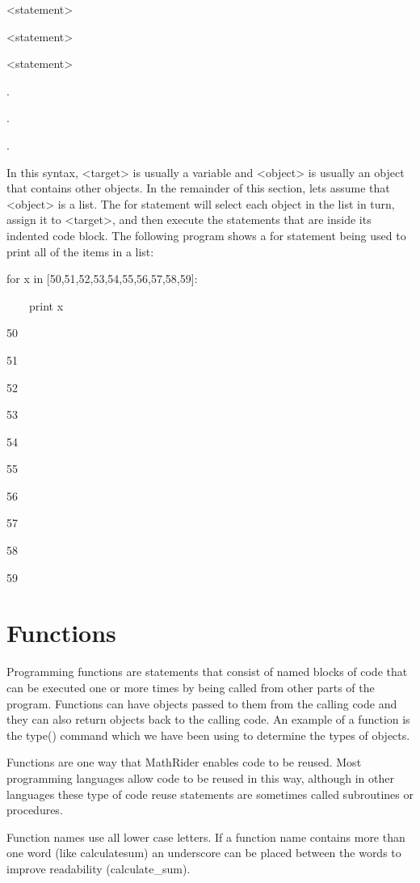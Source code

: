 \documentclass[12pt,oneside]{book}
\begin{document}
 {\textless}statement{\textgreater}

 {\textless}statement{\textgreater}

 {\textless}statement{\textgreater}

.

.

.


In this syntax, {\textless}target{\textgreater} is usually a variable and {\textless}object{\textgreater} is usually an object that contains other objects. In the remainder of this section, lets assume that {\textless}object{\textgreater} is a list. The for statement will select each object in the list in turn, assign it to {\textless}target{\textgreater}, and then execute the statements that are inside its indented code block. The following program shows a for statement being used to print all of the items in a list: 

for x in [50,51,52,53,54,55,56,57,58,59]:

\ \ \ \ print x

{\textbar}

50

51

52

53

54

55

56

57

58

59

\section[Functions]{Functions}

Programming functions are statements that consist of named blocks of code that can be executed one or more times by being called from other parts of the program. Functions can have objects passed to them from the calling code and they can also return objects back to the calling code. An example of a function is the type() command which we have been using to determine the types of objects. 

Functions are one way that MathRider enables code to be reused. Most programming languages allow code to be reused in this way, although in other languages these type of code reuse statements are sometimes called subroutines or procedures. 

Function names use all lower case letters. If a function name contains more than one word (like calculatesum) an underscore can be placed between the words to improve readability (calculate\_sum).
\end{document}
